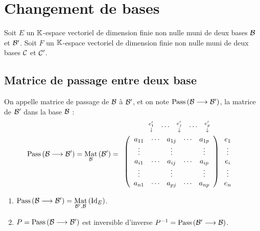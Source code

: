 \section{Changement de bases}
Soit \(E\) un \(\K\)-espace vectoriel de dimension finie non nulle muni de deux bases \(\cal{B}\) et \(\cal{B'}\).
Soit \(F\) un \(\K\)-espace vectoriel de dimension finie non nulle muni de deux bases \(\cal{C}\) et \(\cal{C'}\).

\subsection{Matrice de passage entre deux base}
\begin{defi}
    On appelle matrice de passage de \(\cal{B}\) à \(\cal{B'}\), et on note \(\pass{\cal{B}}{\cal{B'}}\), la matrice de \(\cal{B'}\) dans la base \(\cal{B}\) :
    \[\pass{\cal{B}}{\cal{B'}} = \Mat{\cal{B}}{\cal{B'}} = 
\begin{array}{c}
  \begin{array}{cccccc}
     \substack{e'_1 \\ \downarrow} 
     & \cdots 
     & \substack{e'_j \\ \downarrow} 
     & \cdots 
     & \substack{e'_p \\ \downarrow}
  \end{array} \\[6pt]
  \left(
  \begin{array}{ccccc}
  a_{11} & \cdots & a_{1j} & \cdots & a_{1p} \\
  \vdots &        & \vdots &        & \vdots \\
  a_{i1} & \cdots & a_{ij} & \cdots & a_{ip} \\
  \vdots &        & \vdots &        & \vdots \\
  a_{n1} & \cdots & a_{pj} & \cdots & a_{np}
  \end{array}
  \right)
  \begin{array}{c}
  e_1 \\
  \vdots \\
  e_i \\
  \vdots \\
  e_n
  \end{array}
\end{array}
\]
\end{defi}

\begin{prop}
    \begin{enumerate}
        \item \(\pass{\cal{B}}{\cal{B'}}=  \Mat{\cal{B'}, \cal{B}}{\id{E}}\).
        \item \(P = \pass{\cal{B}}{\cal{B'}}\) est inversible d’inverse \(P^{-1} = \pass{\cal{B'}}{\cal{B}}\).
    \end{enumerate}
\end{prop}

